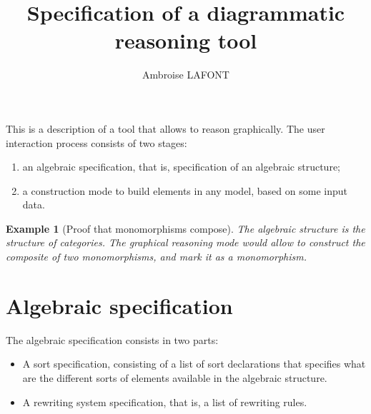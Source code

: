 \documentclass{article}
\title{Specification of a diagrammatic reasoning tool}
\author{Ambroise LAFONT}
\newtheorem{example}{Example}[section]
\begin{document}
\maketitle{}

%  
This is a description of a tool that allows to reason graphically. 
The user interaction process consists of two stages:


\begin{enumerate}
    \item an algebraic specification, that is, specification of an algebraic structure;
    \item a construction mode 
    to build elements in any model, based on some input data.
    \end{enumerate}
    \begin{example}[Proof that monomorphisms compose]
        \label{ex:proof-mono}
        The algebraic structure is the structure of categories.
        The graphical reasoning mode would allow to construct the composite of two monomorphisms, and mark it as a monomorphism.
    \end{example}
    \tableofcontents
\section{Algebraic specification}
The algebraic specification consists in two parts:
\begin{itemize}
    \item A sort specification, consisting of a list of sort declarations that specifies what are the different sorts of elements available in the algebraic structure.
    \item A rewriting system specification, that is, a list of rewriting rules.
\end{itemize}
\end{document}
